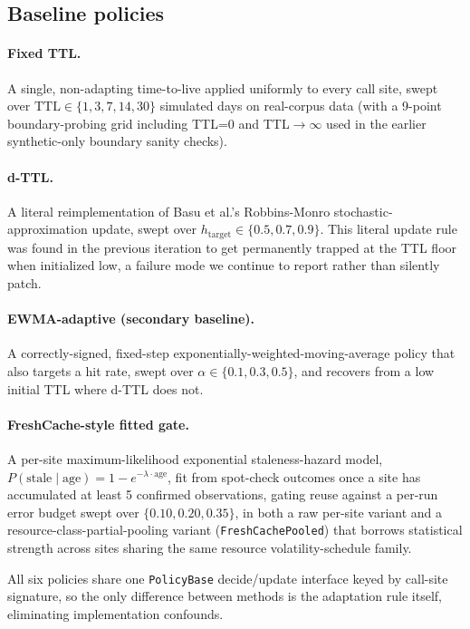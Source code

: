 \documentclass[11pt,letterpaper]{article}
\begin{document}
\subsection{Baseline policies}

\paragraph{Fixed TTL.} A single, non-adapting time-to-live applied uniformly to every call site, swept over
$\text{TTL}\in\{1,3,7,14,30\}$ simulated days on real-corpus data (with a 9-point boundary-probing grid
including TTL=0 and TTL$\to\infty$ used in the earlier synthetic-only boundary sanity checks).

\paragraph{d-TTL.} A literal reimplementation of Basu et al.'s \citep{Basu2017} Robbins-Monro stochastic-approximation
update, swept over $h_{\text{target}}\in\{0.5,0.7,0.9\}$. This literal update rule was found in the previous
iteration to get permanently trapped at the TTL floor when initialized low, a failure mode we continue to
report rather than silently patch.

\paragraph{EWMA-adaptive (secondary baseline).} A correctly-signed, fixed-step exponentially-weighted-moving-average
policy that also targets a hit rate, swept over $\alpha\in\{0.1,0.3,0.5\}$, and recovers from a low initial
TTL where d-TTL does not.

\paragraph{FreshCache-style fitted gate.} A per-site maximum-likelihood exponential staleness-hazard model,
$P(\text{stale}\mid\text{age}) = 1 - e^{-\lambda \cdot \text{age}}$, fit from spot-check outcomes once a
site has accumulated at least 5 confirmed observations, gating reuse against a per-run error budget swept
over $\{0.10, 0.20, 0.35\}$, in both a raw per-site variant and a resource-class-partial-pooling variant
(\texttt{FreshCachePooled}) that borrows statistical strength across sites sharing the same resource
volatility-schedule family.

All six policies share one \texttt{PolicyBase} decide/update interface keyed by call-site signature, so the only
difference between methods is the adaptation rule itself, eliminating implementation confounds.
\end{document}
